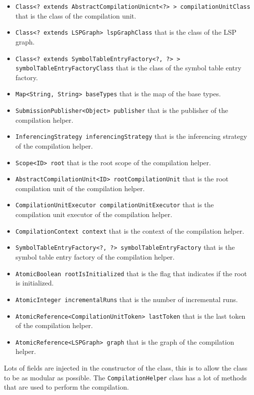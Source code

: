 \begin{itemize}
 \item \texttt{Class<? extends AbstractCompilationUnicnt<?> > compilationUnitClass} that is the class of the compilation unit.
  \item \texttt{Class<? extends LSPGraph> lspGraphClass} that is the class of the LSP graph.
  \item \texttt{Class<? extends SymbolTableEntryFactory<?, ?> > symbolTableEntryFactoryClass} that is the class of the symbol table entry factory.
  \item \texttt{Map<String, String> baseTypes} that is the map of the base types.
  \item \texttt{SubmissionPublisher<Object> publisher} that is the publisher of the compilation helper.
  \item \texttt{InferencingStrategy inferencingStrategy} that is the inferencing strategy of the compilation helper.
  \item \texttt{Scope<ID> root} that is the root scope of the compilation helper.
  \item \texttt{AbstractCompilationUnit<ID> rootCompilationUnit} that is the root compilation unit of the compilation helper.
  \item \texttt{CompilationUnitExecutor compilationUnitExecutor} that is the compilation unit executor of the compilation helper.
  \item \texttt{CompilationContext context} that is the context of the compilation helper.
  \item \texttt{SymbolTableEntryFactory<?, ?> symbolTableEntryFactory} that is the symbol table entry factory of the compilation helper.
  \item \texttt{AtomicBoolean rootIsInitialized} that is the flag that indicates if the root is initialized.
  \item \texttt{AtomicInteger incrementalRuns} that is the number of incremental runs.
  \item \texttt{AtomicReference<CompilationUnitToken> lastToken} that is the last token of the compilation helper.
  \item \texttt{AtomicReference<LSPGraph> graph} that is the graph of the compilation helper.
\end{itemize}

Lots of fields are injected in the constructor of the class, this is to allow the class to be as modular as possible. The \texttt{CompilationHelper} class has a lot of methods that are used to perform the compilation.


